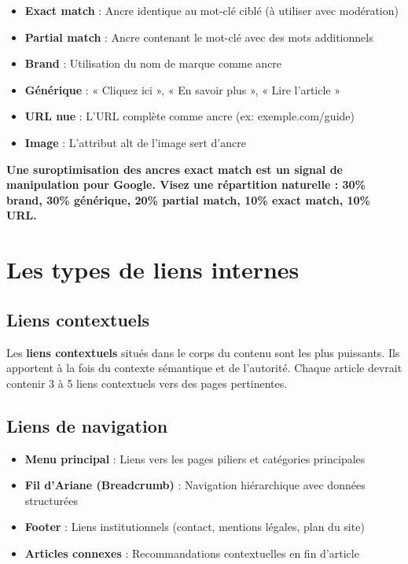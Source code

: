 \documentclass[12pt,a4paper,twoside]{report}
\newcommand{\keyword}[1]{\textbf{\textcolor{googleblue}{#1}}}
\newcommand{\important}[1]{\textbf{\textcolor{googlered}{#1}}}
\begin{document}
\begin{itemize}
    \item \textbf{Exact match} : Ancre identique au mot-clé ciblé (à utiliser avec modération)
    \item \textbf{Partial match} : Ancre contenant le mot-clé avec des mots additionnels
    \item \textbf{Brand} : Utilisation du nom de marque comme ancre
    \item \textbf{Générique} : « Cliquez ici », « En savoir plus », « Lire l'article »
    \item \textbf{URL nue} : L'URL complète comme ancre (ex: exemple.com/guide)
    \item \textbf{Image} : L'attribut alt de l'image sert d'ancre
\end{itemize}

\important{Une suroptimisation des ancres exact match est un signal de manipulation pour Google. Visez une répartition naturelle : 30\% brand, 30\% générique, 20\% partial match, 10\% exact match, 10\% URL.}

\section{Les types de liens internes}

\subsection{Liens contextuels}

Les \keyword{liens contextuels} situés dans le corps du contenu sont les plus puissants. Ils apportent à la fois du contexte sémantique et de l'autorité. Chaque article devrait contenir 3 à 5 liens contextuels vers des pages pertinentes.

\subsection{Liens de navigation}

\begin{itemize}
    \item \textbf{Menu principal} : Liens vers les pages piliers et catégories principales
    \item \textbf{Fil d'Ariane (Breadcrumb)} : Navigation hiérarchique avec données structurées
    \item \textbf{Footer} : Liens institutionnels (contact, mentions légales, plan du site)
    \item \textbf{Articles connexes} : Recommandations contextuelles en fin d'article
\end{itemize}
\end{document}
